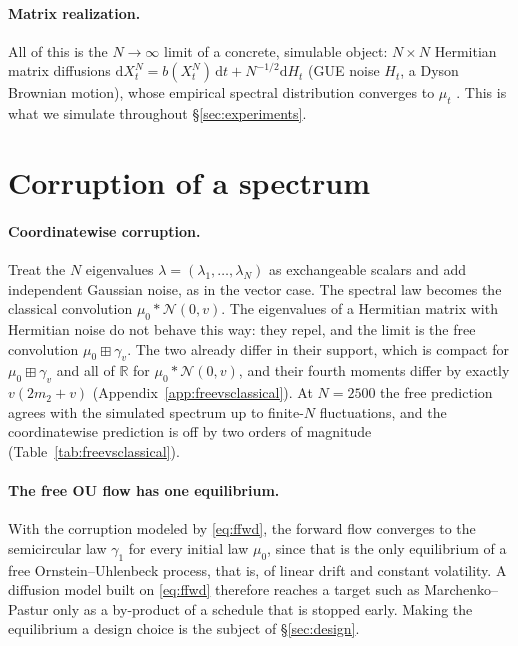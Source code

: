 \documentclass[11pt]{article}
\newcommand{\R}{\mathbb{R}}
\newcommand{\dd}{\mathrm{d}}
\theoremstyle{plain}
\theoremstyle{definition}
\theoremstyle{remark}
\begin{document}
\paragraph{Matrix realization.} All of this is the $N\to\infty$ limit of a concrete,
simulable object: $N\times N$ Hermitian matrix diffusions $\dd X^N_t = b(X^N_t)\,\dd
t + N^{-1/2}\dd H_t$ (GUE noise $H_t$, a Dyson Brownian motion), whose empirical
spectral distribution converges to $\mu_t$ \citep{Dyson1962, RogersShi1993}. This is
what we simulate throughout \S\ref{sec:experiments}.

\section{Corruption of a spectrum}\label{sec:naive}

\paragraph{Coordinatewise corruption.} Treat the $N$ eigenvalues
$\lambda=(\lambda_1,\dots,\lambda_N)$ as exchangeable scalars and add independent Gaussian
noise, as in the vector case. The spectral law becomes the classical convolution
$\mu_0*\mathcal N(0,v)$. The eigenvalues of a Hermitian matrix with Hermitian noise do not
behave this way: they repel, and the limit is the free convolution $\mu_0\boxplus\gamma_v$. The
two already differ in their support, which is compact for $\mu_0\boxplus\gamma_v$ and all of
$\R$ for $\mu_0*\mathcal N(0,v)$, and their fourth moments differ by exactly $v(2m_2+v)$
(Appendix~\ref{app:freevsclassical}). At $N=2500$ the free prediction agrees with the simulated
spectrum up to finite-$N$ fluctuations, and the coordinatewise prediction is off by two orders
of magnitude (Table~\ref{tab:freevsclassical}).

\paragraph{The free OU flow has one equilibrium.} With the corruption modeled by
\eqref{eq:ffwd}, the forward flow converges to the semicircular law $\gamma_1$ for every
initial law $\mu_0$, since that is the only equilibrium of a free Ornstein--Uhlenbeck process,
that is, of linear drift and constant volatility. A diffusion model built on \eqref{eq:ffwd}
therefore reaches a target such as Marchenko--Pastur only as a by-product of a schedule that is
stopped early. Making the equilibrium a design choice is the subject of \S\ref{sec:design}.
\end{document}
